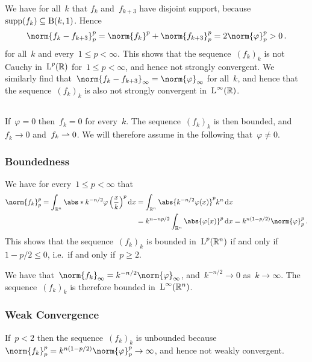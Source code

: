 We have for all~$k$ that $f_k$ and~$f_{k+3}$ have disjoint support, because~$\supp(f_k) \subseteq \ball{1}{k}$.
Hence
\[
    \norm{f_k - f_{k+3}}_p^p
  = \norm{f_k}^p + \norm{f_{k+3}}_p^p
  = 2 \norm{\varphi}_p^p
  > 0 \,.
\]
for all~$k$ and every~$1 \leq p < \infty$.
This shows that the sequence~$(f_k)_k$ is not Cauchy in~$\Lp^p(\Real)$ for~$1 \leq p < \infty$, and hence not strongly convergent.
We similarly find that~$\norm{f_k - f_{k+3}}_\infty = \norm{\varphi}_\infty$ for all~$k$, and hence that the sequence~$(f_k)_k$ is also not strongly convergent in~$\Lp^\infty(\Real)$.





\subsection{}

If~$\varphi = 0$ then~$f_k = 0$ for every~$k$.
The sequence~$(f_k)_k$ is then bounded, and~$f_k \to 0$ and~$f_k \wto 0$.
We will therefore assume in the following that~$\varphi \neq 0$.



\subsubsection{Boundedness}

We have for every~$1 \leq p < \infty$ that
\begin{align*}
      \norm{f_k}_p^p
   =  \int_{\Real^n} \abs*{ k^{-n/2} \varphi\left( \frac{x}{k} \right) }^p \dd{x}
  &= \int_{\Real^n} \abs{ k^{-n/2} \varphi(x) }^p k^n \dd{x}  \\
  &= k^{n - np/2} \int_{\Real^n} \abs{\varphi(x)}^p \dd{x}
   = k^{n(1 - p/2)} \norm{\varphi}_p^p \,.
\end{align*}
This shows that the sequence~$(f_k)_k$ is bounded in~$\Lp^p(\Real^n)$ if and only if~$1-p/2 \leq 0$, i.e.\ if and only if~$p \geq 2$.

We have that~$\norm{f_k}_\infty = k^{-n/2} \norm{\varphi}_{\infty}$, and~$k^{-n/2} \to 0$ as~$k \to \infty$.
The sequence~$(f_k)_k$ is therefore bounded in~$\Lp^\infty(\Real^n)$.



\subsubsection{Weak Convergence}

If~$p < 2$ then the sequence~$(f_k)_k$ is unbounded because~$\norm{f_k}_p^p = k^{n(1-p/2)} \norm{\varphi}_p^p \to \infty$, and hence not weakly convergent.

